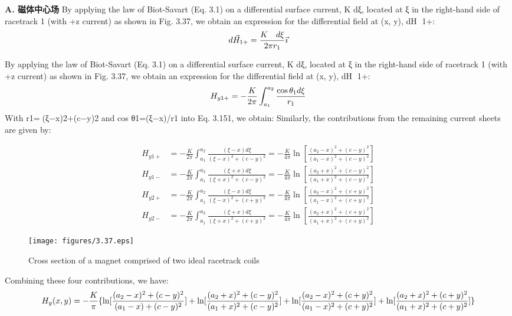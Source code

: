 \textbf{A. 磁体中心场}
By applying the law of Biot-Savart (Eq. 3.1) on a differential surface current, K dξ,
located at ξ in the right-hand side of racetrack 1 (with +z current) as shown in
Fig. 3.37, we obtain an expression for the differential field at (x, y), dH 1+:
$$
d\vec{H}_{1+}=\frac{K\quad d\xi}{2\pi r_{1}}\vec{\imath}\\%
$$

By applying the law of Biot-Savart (Eq. 3.1) on a differential surface current, K dξ,
located at ξ in the right-hand side of racetrack 1 (with +z current) as shown in
Fig. 3.37, we obtain an expression for the differential field at (x, y), dH 1+:
$$
H_{y1+}=-\frac{K}{2\pi}\int_{a_{1}}^{a_{2}}\frac{\cos\theta_{1}d\xi}{r_{1}}\\%
$$
With r1=(ξ−x)2+(c−y)2 and cos θ1=(ξ−x)/r1 into Eq. 3.151, we obtain:
Similarly, the contributions from the remaining current sheets are given by:

\begin{eqnarray*}
H_{y1+}&=-\frac{K}{2\pi}\int_{a_{1}}^{a_{2}}\frac{(\xi-x)d\xi}{(\xi-x)^{2}+(c-y)^{2}}=-\frac{K}{4\pi}\ln[\frac{(a_{2}-x)^{2}+(c-y)^{2}}{(a_{1}-x)^{2}+(c-y)^{2}}]\\%
H_{y1-}&=-\frac{K}{2\pi}\int_{a_{1}}^{a_{2}}\frac{(\xi+x)d\xi}{(\xi+x)^{2}+(c-y)^{2}}=-\frac{K}{4\pi}\ln[\frac{(a_{2}+x)^{2}+(c-y)^{2}}{(a_{1}+x)^{2}+(c-y)^{2}}]\\%
H_{y2+}&=-\frac{K}{2\pi}\int_{a_{1}}^{a_{2}}\frac{(\xi-x)d\xi}{(\xi-x)^{2}+(c+y)^{2}}=-\frac{K}{4\pi}\ln[\frac{(a_{2}-x)^{2}+(c+y)^{2}}{(a_{1}-x)^{2}+(c+y)^{2}}]\\%
H_{y2-}&=-\frac{K}{2\pi}\int_{a_{1}}^{a_{2}}\frac{(\xi+x)d\xi}{(\xi+x)^{2}+(c+y)^{2}}=-\frac{K}{4\pi}\ln[\frac{(a_{2}+x)^{2}+(c+y)^{2}}{(a_{1}+x)^{2}+(c+y)^{2}}]%
\end{eqnarray*}

\begin{figure}[htbp]
	\centering
	\texttt{[image: figures/3.37.eps]}
	\caption{Cross section of a magnet comprised of two ideal racetrack coils}
\end{figure}

Combining these four contributions, we have:
$$H_{y}(x,y)=-\frac{K}{\pi}\{\ln[\frac{(a_{2}-x)^{2}+(c-y)^{2}}{(a_{1}-x)+(c-y)^{2}}]+\ln[\frac{(a_{2}+x)^{2}+(c-y)^{2}}{(a_{1}+x)^{2}+(c-y)^{2}}]\\
+\ln[\frac{(a_{2}-x)^{2}+(c+y)^{2}}{(a_{1}-x)^{2}+(c+y)^{2}}]+\ln[\frac{(a_{2}+x)^{2}+(c+y)^{2}}{(a_{1}+x)^{2}+(c+y)^{2}}]\}\\%
$$

